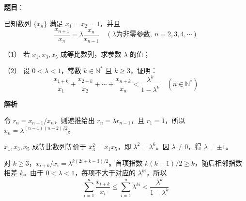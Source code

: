 \begin{answer}

\textbf{题目}：

已知数列 $\{x_n\}$ 满足 $x_1=x_2=1$，并且
\nopagebreak[4]
\[
\frac{x_{n+1}}{x_n}=\lambda\frac{x_n}{x_{n-1}}\quad(\lambda\text{为非零参数},\ n=2,3,4,\cdots)
\]

（1） 若 $x_1,x_3,x_5$ 成等比数列，求参数 $\lambda$ 的值；

（2） 设 $0<\lambda<1$，常数 $k\in\mathbb N^*$ 且 $k\ge3$，证明：
\nopagebreak[4]
\[
\frac{x_{1+k}}{x_1}+\frac{x_{2+k}}{x_2}+\cdots+\frac{x_{n+k}}{x_n}<\frac{\lambda^k}{1-\lambda^k}\quad(n\in\mathbb N^*)
\]

\textbf{解析}

令 $r_n=x_{n+1}/x_n$，则递推给出 $r_n=\lambda r_{n-1}$，且 $r_1=1$，所以 $x_n=\lambda^{(n-1)(n-2)/2}$。


$x_1,x_3,x_5$ 成等比数列等价于 $x_3^2=x_1x_5$，即 $\lambda^2=\lambda^6$。因 $\lambda\ne0$，得 $\lambda=\pm1$。


对 $k\ge3$，$x_{i+k}/x_i=\lambda^{k(2i+k-3)/2}$。首项指数 $k(k-1)/2\ge k$，随后相邻指数相差 $k$。由于 $0<\lambda<1$，每项不大于对应的 $\lambda^{ki}$，所以
\nopagebreak[4]
\[
\sum_{i=1}^{n}\frac{x_{i+k}}{x_i}\le\sum_{i=1}^{n}\lambda^{ki}<\frac{\lambda^k}{1-\lambda^k}
\]



\end{answer}
